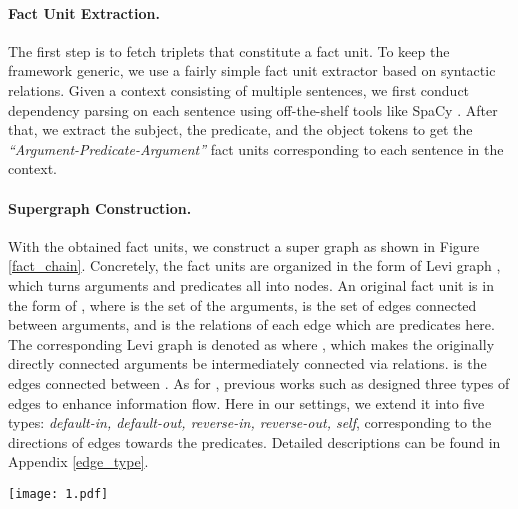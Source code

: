 \documentclass[11pt]{article}
\begin{document}
\paragraph{Fact Unit Extraction.} The first step is to fetch triplets that constitute a fact unit. To keep the framework generic, we use a fairly simple fact unit extractor based on syntactic relations. Given a context consisting of multiple sentences, we first conduct dependency parsing on each sentence using off-the-shelf tools like SpaCy \citep{spacy2}. After that, we extract the subject, the predicate, and the object tokens to get the \textit{``Argument-Predicate-Argument''} fact units corresponding to each sentence in the context.







\paragraph{Supergraph Construction.}
With the obtained fact units, 
we construct a super graph as shown in Figure \ref{fact_chain}.
Concretely, the fact units are organized in the form of Levi graph \citep{levi-1942}, which turns arguments and predicates all into nodes. An original fact unit is in the form of , where  is the set of the arguments,  is the set of edges connected between arguments, and  is the relations of each edge which are predicates here. The corresponding Levi graph is denoted as  where , which makes the originally directly connected arguments be intermediately connected via relations.  is the edges connected between . As for , previous works such as \citep{marcheggiani-titov-2017-encoding, beck-etal-2018-graph} designed three types of edges  to enhance information flow. Here in our settings, we extend it into five types: \textit{default-in, default-out, reverse-in, reverse-out, self}, corresponding to the directions of edges towards the predicates. Detailed descriptions can be found in Appendix \ref{edge_type}.



\begin{figure*}
\vspace{-3 mm}
\centering
\texttt{[image: 1.pdf]}
\caption{The process of constructing the fact chain and its corresponding Levi graph form of an example in Figure \ref{example_logic}. Entities and relations are illustrated in their corresponding color.}
\label{fact_chain}
\vspace{-3 mm}
\end{figure*}
\end{document}
